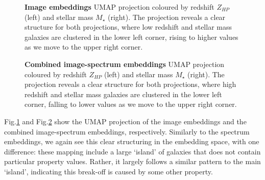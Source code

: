 \documentclass[a4paper,12pt]{article}
\begin{document}
\begin{figure}[H]
    \centering
    \caption{\textbf{Image embeddings} UMAP projection coloured by redshift $Z_{HP}$ (left) and stellar mass $M_{\star}$ (right). The projection reveals a clear structure for both projections, where low redshift and stellar mass galaxies are clustered in the lower left corner, rising to higher values as we move to the upper right corner.}
    \label{fig:umap_of_images}
\end{figure}


\begin{figure}[H]
    \centering
    \caption{ \textbf{Combined image-spectrum embeddings} UMAP projection coloured by redshift $Z_{HP}$ (left) and stellar mass $M_{\star}$ (right). The projection reveals a clear structure for both projections, where high redshift and stellar mass galaxies are clustered in the lower left corner, falling to lower values as we move to the upper right corner.}
    \label{fig:umap_of_both}
\end{figure}

Fig.\ref{fig:umap_of_images} and Fig.\ref{fig:umap_of_both} show the UMAP projection of the image embeddings and the combined image-spectrum embeddings, respectively. Similarly to the spectrum embeddings, we again see this clear structuring in the embedding space, with one difference: these mapping include a large `island' of galaxies that does not contain particular property values. Rather, it largely follows a similar pattern to the main `island', indicating this break-off is caused by some other property.



\end{document}
